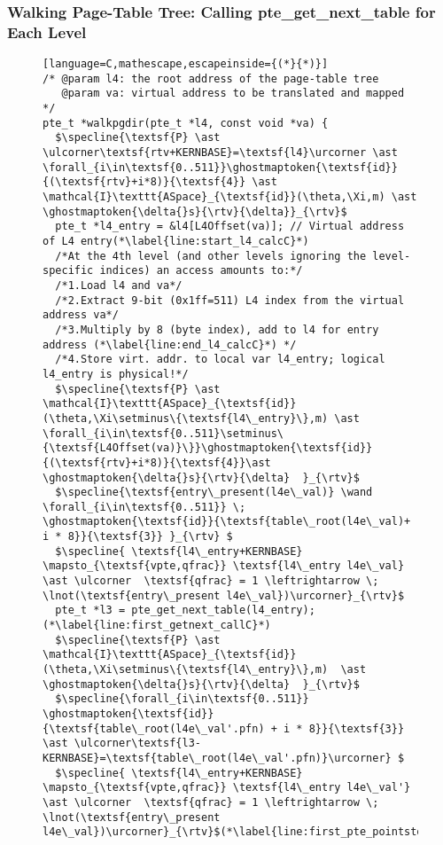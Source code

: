 \subsubsection{Walking Page-Table Tree: Calling \textsf{pte\_get\_next\_table} for Each Level}
\label{wlkpgdirC}
\begin{figure}\footnotesize
\ifPLDI
\begin{lstlisting}[language=C,mathescape,escapeinside={(*}{*)}]
/* @param l4: the root address of the page-table tree
   @param va: virtual address to be translated and mapped */
pte_t *walkpgdir(pte_t *l4, const void *va) {
  $\specline{\textsf{P} \ast \ulcorner\textsf{rtv+KERNBASE}=\textsf{l4}\urcorner \ast \forall_{i\in\textsf{0..511}}\ghostmaptoken{\textsf{id}}{(\textsf{rtv}+i*8)}{\textsf{4}} \ast \mathcal{I}\texttt{ASpace}_{\textsf{id}}(\theta,\Xi,m) \ast \ghostmaptoken{\delta{}s}{\rtv}{\delta}}_{\rtv}$
  pte_t *l4_entry = &l4[L4Offset(va)]; // Virtual address of L4 entry(*\label{line:start_l4_calcC}*)
  /*At the 4th level (and other levels ignoring the level-specific indices) an access amounts to:*/
  /*1.Load l4 and va*/
  /*2.Extract 9-bit (0x1ff=511) L4 index from the virtual address va*/
  /*3.Multiply by 8 (byte index), add to l4 for entry address (*\label{line:end_l4_calcC}*) */
  /*4.Store virt. addr. to local var l4_entry; logical l4_entry is physical!*/
  $\specline{\textsf{P} \ast \mathcal{I}\texttt{ASpace}_{\textsf{id}}(\theta,\Xi\setminus\{\textsf{l4\_entry}\},m) \ast \forall_{i\in\textsf{0..511}\setminus\{\textsf{L4Offset(va)}\}}\ghostmaptoken{\textsf{id}}{(\textsf{rtv}+i*8)}{\textsf{4}}\ast \ghostmaptoken{\delta{}s}{\rtv}{\delta}  }_{\rtv}$
  $\specline{\textsf{entry\_present(l4e\_val)} \wand \forall_{i\in\textsf{0..511}} \; \ghostmaptoken{\textsf{id}}{\textsf{table\_root(l4e\_val)+ i * 8}}{\textsf{3}} }_{\rtv} $
  $\specline{ \textsf{l4\_entry+KERNBASE} \mapsto_{\textsf{vpte,qfrac}} \textsf{l4\_entry l4e\_val} \ast \ulcorner  \textsf{qfrac} = 1 \leftrightarrow \; \lnot(\textsf{entry\_present l4e\_val})\urcorner}_{\rtv}$    
  pte_t *l3 = pte_get_next_table(l4_entry); (*\label{line:first_getnext_callC}*) 
  $\specline{\textsf{P} \ast \mathcal{I}\texttt{ASpace}_{\textsf{id}}(\theta,\Xi\setminus\{\textsf{l4\_entry}\},m)  \ast \ghostmaptoken{\delta{}s}{\rtv}{\delta}  }_{\rtv}$
  $\specline{\forall_{i\in\textsf{0..511}} \ghostmaptoken{\textsf{id}}{\textsf{table\_root(l4e\_val'.pfn) + i * 8}}{\textsf{3}}  \ast \ulcorner\textsf{l3-KERNBASE}=\textsf{table\_root(l4e\_val'.pfn)}\urcorner} $
  $\specline{ \textsf{l4\_entry+KERNBASE} \mapsto_{\textsf{vpte,qfrac}} \textsf{l4\_entry l4e\_val'} \ast \ulcorner  \textsf{qfrac} = 1 \leftrightarrow \; \lnot(\textsf{entry\_present l4e\_val})\urcorner}_{\rtv}$(*\label{line:first_pte_pointstoC}*)

\end{lstlisting}
\end{figure}
